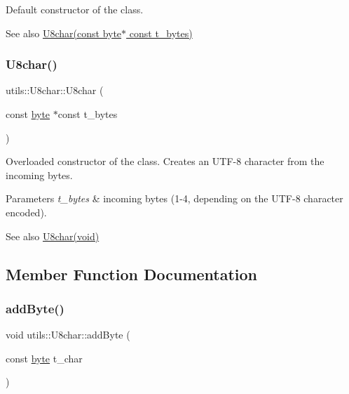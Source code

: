 Default constructor of the class. \begin{DoxySeeAlso}{See also}
\hyperlink{classutils_1_1U8char_a68db482bb7267ce30adff8e5ae8e18ad}{U8char(const byte$\ast$ const t\+\_\+bytes)} 
\end{DoxySeeAlso}
\mbox{\label{classutils_1_1U8char_a68db482bb7267ce30adff8e5ae8e18ad}} 
\subsubsection{\texorpdfstring{U8char()}{U8char()}\hspace{0.1cm}{\footnotesize\ttfamily [2/2]}}
{\footnotesize\ttfamily utils\+::\+U8char\+::\+U8char (\begin{DoxyParamCaption}\item[{const \hyperlink{namespaceutils_a6ec9293c5f79998946269edb0f6bc028}{byte} $\ast$const}]{t\+\_\+bytes }\end{DoxyParamCaption})}

Overloaded constructor of the class. Creates an U\+T\+F-\/8 character from the incoming bytes. 
\begin{DoxyParams}{Parameters}
{\em t\+\_\+bytes} & incoming bytes (1-\/4, depending on the U\+T\+F-\/8 character encoded). \\
\hline
\end{DoxyParams}
\begin{DoxySeeAlso}{See also}
\hyperlink{classutils_1_1U8char_a2d500aa5e968fd99c6bd4012f63c54c5}{U8char(void)} 
\end{DoxySeeAlso}


\subsection{Member Function Documentation}
\mbox{\label{classutils_1_1U8char_a749ac883897f455715be1083ed1c80dd}} 
\subsubsection{\texorpdfstring{add\+Byte()}{addByte()}}
{\footnotesize\ttfamily void utils\+::\+U8char\+::add\+Byte (\begin{DoxyParamCaption}\item[{const \hyperlink{namespaceutils_a6ec9293c5f79998946269edb0f6bc028}{byte}}]{t\+\_\+char }\end{DoxyParamCaption})}

